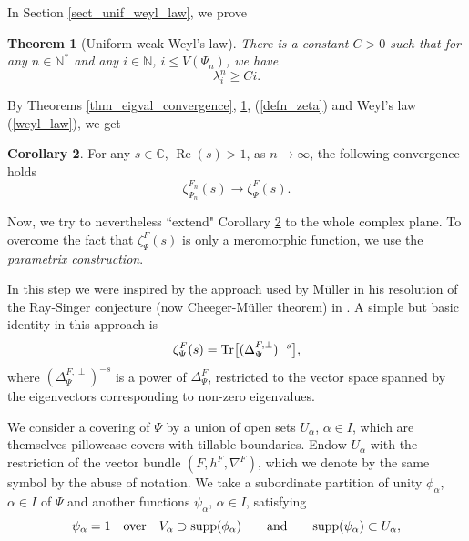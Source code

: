 \documentclass[12pt]{article}
\numberwithin{equation}{section}
\theoremstyle{theorem}
\newtheorem{thm}{Theorem}[section]
\theoremstyle{definition}
\newtheorem{cor}[thm]{Corollary}
\theoremstyle{remark}
\newcommand{\comp}{\mathbb{C}}
\newcommand{\nat}{\mathbb{N}}
\newcommand{\laplcomp}{\Delta}
\newcommand{\tr}[1]{{\rm{Tr}} \big[ #1 \big]}
\renewcommand{\Re}{\operatorname{Re}}
\begin{document}
	In Section \ref{sect_unif_weyl_law}, we prove
	\begin{thm}[Uniform weak Weyl's law]\label{thm_unif_bnd_eig}
		There is a constant $C > 0$ such that for any $n \in \nat^*$ and any $i \in \nat$, $i \leq V(\Psi_n)$, we have
		\begin{equation}\label{eq_unif_bnd_eig}
			\lambda_{i}^{n} \geq C i.
		\end{equation}
	\end{thm}
	By Theorems \ref{thm_eigval_convergence}, \ref{thm_unif_bnd_eig}, (\ref{defn_zeta}) and Weyl's law (\ref{weyl_law}), we get
	\begin{cor}\label{cor_zeta_conv_re1}
		For any $s \in \comp$, $\Re(s) > 1$, as $n \to \infty$, the following convergence holds
		\begin{equation}
			\zeta_{\Psi_n}^{F_n}(s) \to \zeta_{\Psi}^{F}(s).
		\end{equation}
	\end{cor}
	\par 
	Now, we try to nevertheless “extend" Corollary \ref{cor_zeta_conv_re1} to the whole complex plane. To overcome the fact that $\zeta_{\Psi}^{F}(s)$ is only a meromorphic function, we use the \textit{parametrix construction}. 
	\par In this step we were inspired by the approach used by Müller in his resolution of the Ray-Singer conjecture (now Cheeger-Müller theorem) in \cite{Mull78}.
	A simple but basic identity in this approach is
	\begin{equation}
		\zeta_{\Psi}^{F}(s) = \tr{(\laplcomp_{\Psi}^{F, \perp})^{-s}},
	\end{equation}	 
	where $(\laplcomp_{\Psi}^{F, \perp})^{-s}$ is a power of $\laplcomp_{\Psi}^{F}$, restricted to the vector space spanned by the eigenvectors corresponding to non-zero eigenvalues.
	\par 
	We consider a covering of $\Psi$ by a union of open sets $U_{\alpha}$, $\alpha \in I$, which are themselves pillowcase covers with tillable boundaries.
	Endow $U_{\alpha}$ with the restriction of the vector bundle $(F, h^F, \nabla^F)$, which we denote by the same symbol by the abuse of notation.
	We take a subordinate partition of unity $\phi_{\alpha}$, $\alpha \in I$ of $\Psi$ and another functions $\psi_{\alpha}$, $\alpha \in I$, satisfying 
	\begin{equation}\label{eq_phi_alpha_assumpt}
		\psi_{\alpha} = 1 \quad \text{over} \quad V_{\alpha} \supset {\rm{supp}}(\phi_{\alpha}) \qquad \text{and} \qquad {\rm{supp}}(\psi_{\alpha}) \subset U_{\alpha},
	\end{equation}
\end{document}
